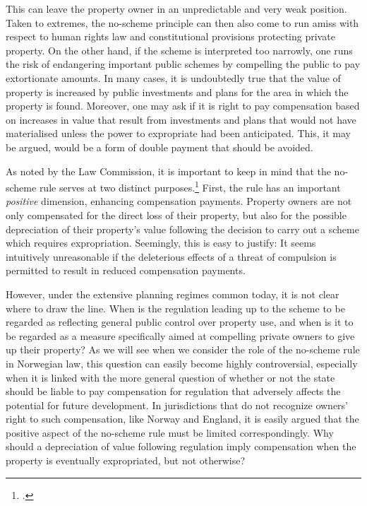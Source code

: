 This can leave the property owner in an unpredictable and very weak position. Taken to extremes, the no-scheme principle can then also come to run amiss with respect to human rights law and constitutional provisions protecting private property. On the other hand, if the scheme is interpreted too narrowly, one runs the risk of endangering important public schemes by compelling the public to pay extortionate amounts. In many cases, it is undoubtedly true that the value of property is increased by public investments and plans for the area in which the property is found. Moreover, one may ask if it is right to pay compensation based on increases in value that result from investments and plans that would not have materialised unless the power to expropriate had been anticipated. This, it may be argued, would be a form of double payment that should be avoided.

As noted by the Law Commission, it is important to keep in mind that the no-scheme rule serves at two distinct purposes.\footcite[69-70]{lawcom03} First, the rule has an important \emph{positive} dimension, enhancing compensation payments. Property owners are not only compensated for the direct loss of their property, but also for the possible depreciation of their property's value following the decision to carry out a scheme which requires expropriation. Seemingly, this is easy to justify: It seems intuitively unreasonable if the deleterious effects of a threat of compulsion is permitted to result in reduced compensation payments.

However, under the extensive planning regimes common today, it is not clear where to draw the line. When is the regulation leading up to the scheme to be regarded as reflecting general public control over property use, and when is it to be regarded as a measure specifically aimed at compelling private owners to give up their property? As we will see when we consider the role of the no-scheme rule in Norwegian law, this question can easily become highly controversial, especially when it is linked with the more general question of whether or not the state should be liable to pay compensation for regulation that adversely affects the potential for future development. In jurisdictions that do not recognize owners' right to such compensation, like Norway and England, it is easily argued that the positive aspect of the no-scheme rule must be limited correspondingly. Why should a depreciation of value following regulation imply compensation when the property is eventually expropriated, but not otherwise?

